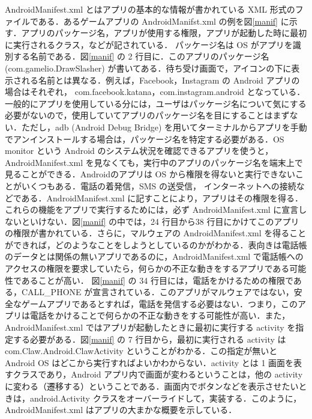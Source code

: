 AndroidManifest.xml とはアプリの基本的な情報が書かれている XML 形式のファイルである．あるゲームアプリの AndroidManifst.xml の例を図\ref{manif} に示す．アプリのパッケージ名，アプリが使用する権限，アプリが起動した時に最初に実行されるクラス，などが記されている． パッケージ名は OS がアプリを識別する名前である．図\ref{manif} の 2 行目に．このアプリのパッケージ名 (com.gamelio.DrawSlasher) が書いてある．待ち受け画面で，アイコンの下に表示される名前とは異なる．例えば，Facebook，Instagram の Android アプリの場合はそれぞれ， com.facebook.katana，com.instagram.android となっている．一般的にアプリを使用している分には，ユーザはパッケージ名について気にする必要がないので，使用していてアプリのパッケージ名を目にすることはまずない．ただし，adb (Android Debug Bridge) を用いてターミナルからアプリを手動でアンインストールする場合は，パッケージ名を特定する必要がある．OS monitor という Android のシステム状況を確認できるアプリを使うと，AndroidManifest.xml を見なくても，実行中のアプリのパッケージ名を端末上で見ることができる．Androidのアプリは OS から権限を得ないと実行できないことがいくつもある．電話の着発信，SMS の送受信， インターネットへの接続などである．AndroidManifest.xml に記すことにより，アプリはその権限を得る．これらの機能をアプリで実行するためには，必ず AndroidManifest.xml に宣言しないといけない．図\ref{manif} の中では，24 行目から38 行目にかけてこのアプリの権限が書かれている．さらに，マルウェアの AndroidManifest.xml を得ることができれば，どのようなことをしようとしているのかがわかる．表向きは電話帳のデータとは関係の無いアプリであるのに，AndroidManifest.xml で電話帳へのアクセスの権限を要求していたら，何らかの不正な動きをするアプリである可能性であることが高い． 図\ref{manif} の 34 行目には，電話をかけるための権限である，CALL\_PHONE が宣言されている．このアプリがマルウェアではない，安全なゲームアプリであるとすれば，電話を発信する必要はない．つまり，このアプリは電話をかけることで何らかの不正な動きをする可能性が高い．また，AndroidManifest.xml ではアプリが起動したときに最初に実行する activity を指定する必要がある．図\ref{manif} の 7 行目から，最初に実行される activity は com.Claw.Android.ClawActivity ということがわかる．この指定が無いと Android OS はどこから実行すればよいかわからない．activity とは 1 画面を表すクラスであり，Android アプリ内で画面が変わるということは，他の activity に変わる（遷移する）ということである．画面内でボタンなどを表示させたいときは，android.Activity クラスをオーバーライドして，実装する．このように，AndroidManifest.xml はアプリの大まかな概要を示している．

